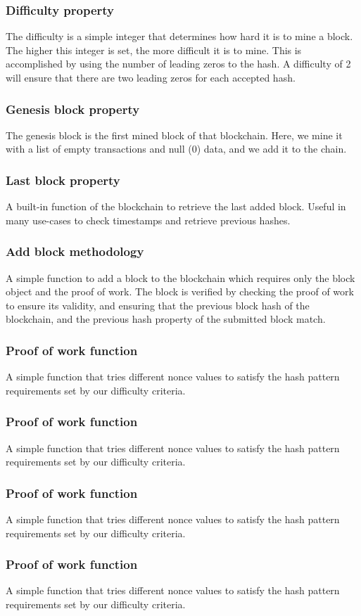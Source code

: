 \documentclass{article}
\begin{document}
    \subsubsection{Difficulty property}
    The difficulty is a simple integer that determines how hard it is to mine a block. The higher this integer is set, the more difficult it is to mine. This is accomplished by using the number of leading zeros to the hash. A difficulty of 2 will ensure that there are two leading zeros for each accepted hash.
    \subsubsection{Genesis block property}
    The genesis block is the first mined block of that blockchain. Here, we mine it with a list of empty transactions and null (0) data, and we add it to the chain.
    \subsubsection{Last block property}
    A built-in function of the blockchain to retrieve the last added block. Useful in many use-cases to check timestamps and retrieve previous hashes.
    \subsubsection{Add block methodology}
    A simple function to add a block to the blockchain which requires only the block object and the proof of work. The block is verified by checking the proof of work to ensure its validity, and ensuring that the previous block hash of the blockchain, and the previous hash property of the submitted block match.
    \subsubsection{Proof of work function}
    A simple function that tries different nonce values to satisfy the hash pattern requirements set by our difficulty criteria.
    \subsubsection{Proof of work function}
    A simple function that tries different nonce values to satisfy the hash pattern requirements set by our difficulty criteria.
    \subsubsection{Proof of work function}
    A simple function that tries different nonce values to satisfy the hash pattern requirements set by our difficulty criteria.
    \subsubsection{Proof of work function}
    A simple function that tries different nonce values to satisfy the hash pattern requirements set by our difficulty criteria.
\end{document}
